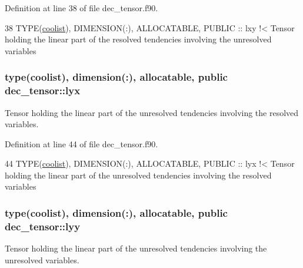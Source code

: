 Definition at line 38 of file dec\+\_\+tensor.\+f90.


\begin{DoxyCode}
38   \textcolor{keywordtype}{TYPE}(\hyperlink{structtensor_1_1coolist}{coolist}), \textcolor{keywordtype}{DIMENSION(:)}, \textcolor{keywordtype}{ALLOCATABLE}, \textcolor{keywordtype}{PUBLIC} :: lxy\textcolor{comment}{ !< Tensor holding the linear part of the
       resolved tendencies involving the unresolved variables}
\end{DoxyCode}
\subsubsection[{\texorpdfstring{lyx}{lyx}}]{\setlength{\rightskip}{0pt plus 5cm}type({\bf coolist}), dimension(\+:), allocatable, public dec\+\_\+tensor\+::lyx}\hypertarget{namespacedec__tensor_aed1ce57179fc836a3c439d8c3da85049}{}\label{namespacedec__tensor_aed1ce57179fc836a3c439d8c3da85049}


Tensor holding the linear part of the unresolved tendencies involving the resolved variables. 



Definition at line 44 of file dec\+\_\+tensor.\+f90.


\begin{DoxyCode}
44   \textcolor{keywordtype}{TYPE}(\hyperlink{structtensor_1_1coolist}{coolist}), \textcolor{keywordtype}{DIMENSION(:)}, \textcolor{keywordtype}{ALLOCATABLE}, \textcolor{keywordtype}{PUBLIC} :: lyx\textcolor{comment}{ !< Tensor holding the linear part of the
       unresolved tendencies involving the resolved variables}
\end{DoxyCode}
\subsubsection[{\texorpdfstring{lyy}{lyy}}]{\setlength{\rightskip}{0pt plus 5cm}type({\bf coolist}), dimension(\+:), allocatable, public dec\+\_\+tensor\+::lyy}\hypertarget{namespacedec__tensor_a0b44998c712bdb9adad15a6bc4df8022}{}\label{namespacedec__tensor_a0b44998c712bdb9adad15a6bc4df8022}


Tensor holding the linear part of the unresolved tendencies involving the unresolved variables. 



